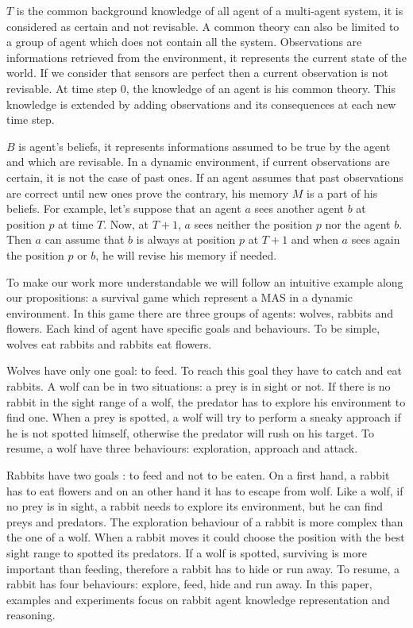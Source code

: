 \documentclass{aamas2012}
\begin{document}
	$T$ is the common background knowledge of all agent of a multi-agent system, it is considered as certain and not revisable.
	A common theory can also be limited to a group of agent which does not contain all the system.
	Observations are informations retrieved from the environment, it represents the current state of the world.
	If we consider that sensors are perfect then a current observation is not revisable.
	At time step 0, the knowledge of an agent is his common theory.
	This knowledge is extended by adding observations and its consequences at each new time step.

	$B$ is agent's beliefs, it represents informations assumed to be true by the agent and which are revisable.
	In a dynamic environment, if current observations are certain, it is not the case of past ones.
	If an agent assumes that past observations are correct until new ones prove the contrary, his memory $M$ is a part of his beliefs.
	For example, let's suppose that an agent $a$ sees another agent $b$ at position $p$ at time $T$.
	Now, at $T+1$, $a$ sees neither the position $p$ nor the agent $b$.
	Then $a$ can assume that $b$ is always at position $p$ at $T+1$ and when $a$ sees again the position $p$ or $b$, he will revise his memory if needed.
	
	To make our work more understandable we will follow an intuitive example along our propositions: a survival game which represent a MAS in a dynamic environment.
	In this game there are three groups of agents: wolves, rabbits and flowers.
	Each kind of agent have specific goals and behaviours.
	To be simple, wolves eat rabbits and rabbits eat flowers.
	
	Wolves have only one goal: to feed.
	To reach this goal they have to catch and eat rabbits.
	A wolf can be in two situations: a prey is in sight or not.
	If there is no rabbit in the sight range of a wolf, the predator has to explore his environment to find one.
	When a prey is spotted, a wolf will try to perform a sneaky approach if he is not spotted himself, otherwise the predator will rush on his target.
	To resume, a wolf have three behaviours: exploration, approach and attack.
	
	Rabbits have two goals : to feed and not to be eaten.
	On a first hand, a rabbit has to eat flowers and on an other hand it has to escape from wolf.
	Like a wolf, if no prey is in sight, a rabbit needs to explore its environment, but he can find preys and predators.
	The exploration behaviour of a rabbit is more complex than the one of a wolf.
	When a rabbit moves it could choose the position with the best sight range to spotted its predators.
	If a wolf is spotted, surviving is more important than feeding, therefore a rabbit has to hide or run away.
	To resume, a rabbit has four behaviours: explore, feed, hide and run away.
	In this paper, examples and experiments focus on rabbit agent knowledge representation and reasoning.
	
\end{document}
